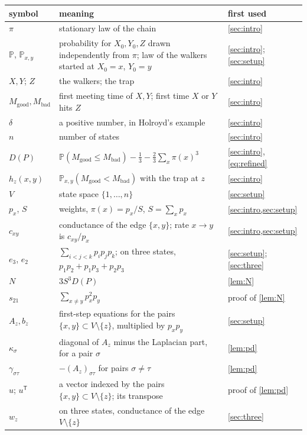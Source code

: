 \documentclass[11pt,a4paper]{article}
\numberwithin{equation}{section}
\theoremstyle{remark}
\newcommand{\Pp}{\mathbb P}
\newcommand{\good}{M_{\mathrm{good}}}
\newcommand{\bad}{M_{\mathrm{bad}}}
\begin{document}
\begin{center}
\small
\begin{tabular}{lp{}l}
\toprule
symbol & meaning & first used\\
\midrule
$\pi$ & stationary law of the chain & \cref{sec:intro}\\
$\Pp$, $\Pp_{x,y}$ & probability for $X_0,Y_0,Z$ drawn independently from $\pi$; law of the walkers started at $X_0=x$, $Y_0=y$ & \cref{sec:intro}; \cref{sec:setup}\\
$X,Y$; $Z$ & the walkers; the trap & \cref{sec:intro}\\
$\good,\bad$ & first meeting time of $X,Y$; first time $X$ or $Y$ hits $Z$ & \cref{sec:intro}\\
$\delta$ & a positive number, in Holroyd's example & \cref{sec:intro}\\
$n$ & number of states & \cref{sec:intro}\\
$D(P)$ & $\Pp(\good\le\bad)-\frac13-\frac23\sum_x\pi(x)^3$ & \cref{sec:intro}, \eqref{eq:refined}\\
$h_z(x,y)$ & $\Pp_{x,y}(\good<\bad)$ with the trap at $z$ & \cref{sec:intro}\\
$V$ & state space $\{1,\dots,n\}$ & \cref{sec:setup}\\
$p_x$, $S$ & weights, $\pi(x)=p_x/S$, $S=\sum_xp_x$ & \cref{sec:intro,sec:setup}\\
$c_{xy}$ & conductance of the edge $\{x,y\}$; rate $x\to y$ is $c_{xy}/p_x$ & \cref{sec:intro,sec:setup}\\
$e_3$, $e_2$ & $\sum_{i<j<k}p_ip_jp_k$; on three states, $p_1p_2+p_1p_3+p_2p_3$ & \cref{sec:setup}; \cref{sec:three}\\
$N$ & $3S^3D(P)$ & \cref{lem:N}\\
$s_{21}$ & $\sum_{x\ne y}p_x^2p_y$ & proof of \cref{lem:N}\\
$A_z,b_z$ & first-step equations for the pairs $\{x,y\}\subset V\setminus\{z\}$, multiplied by $p_xp_y$ & \cref{sec:setup}\\
$\kappa_\sigma$ & diagonal of $A_z$ minus the Laplacian part, for a pair $\sigma$ & \cref{lem:pd}\\
$\gamma_{\sigma\tau}$ & $-(A_z)_{\sigma\tau}$ for pairs $\sigma\ne\tau$ & \cref{lem:pd}\\
$u$; $u^{\mathsf T}$ & a vector indexed by the pairs $\{x,y\}\subset V\setminus\{z\}$; its transpose & proof of \cref{lem:pd}\\
$w_z$ & on three states, conductance of the edge $V\setminus\{z\}$ & \cref{sec:three}\\

\end{tabular}
\end{center}
\end{document}
